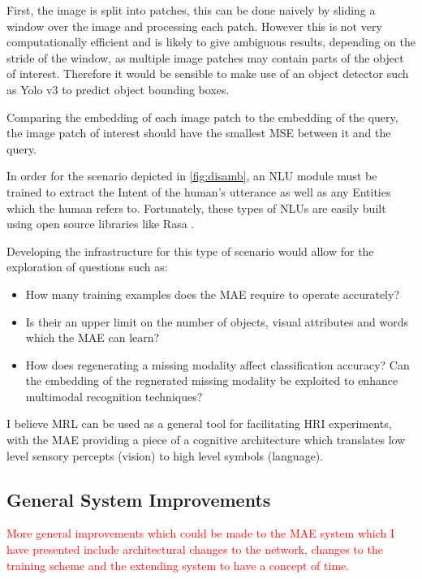 First, the image is split into patches, this can be done naively by sliding a window over the image and processing each patch. However this is not very computationally efficient and is likely to give ambiguous results, depending on the stride of the window, as multiple image patches may contain parts of the object of interest. Therefore it would be sensible to make use of an object detector such as Yolo v3 \cite{redmon2018yolov3} to predict object bounding boxes.

Comparing the embedding of each image patch to the embedding of the query, the image patch of interest should have the smallest \ac{MSE} between it and the query.

In order for the scenario depicted in \autoref{fig:disamb}, an \ac{NLU} module must be trained to extract the Intent of the human's utterance as well as any Entities which the human refers to. Fortunately, these types of \acp{NLU} are easily built using open source libraries like Rasa \cite{rasa}.



Developing the infrastructure for this type of scenario would allow for the exploration of questions such as:

\begin{itemize}
\item How many training examples does the \ac{MAE} require to operate accurately?
\item Is their an upper limit on the number of objects, visual attributes and words which the \ac{MAE} can learn?
\item How does regenerating a missing modality affect classification accuracy? Can the embedding of the regnerated missing modality be exploited to enhance  multimodal recognition techniques?
\end{itemize}

I believe \ac{MRL} can be used as a general tool for facilitating \ac{HRI} experiments, with the \ac{MAE} providing a piece of a cognitive architecture which translates low level sensory percepts (vision) to high level symbols (language).



\subsection{General System Improvements}
\textcolor{red}{More general improvements which could be made to the \ac{MAE} system which I have presented include architectural changes to the network, changes to the training scheme and the extending system to have a concept of time.}

